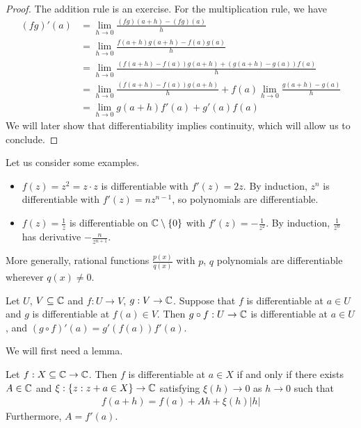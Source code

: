 \documentclass{../template/note}
\begin{document}
    \begin{proof}
        The addition rule is an exercise. For the multiplication rule, we have
        \begin{align*}
            (fg)'(a) &= \lim_{h \to 0} \frac{(fg)(a+h) - (fg)(a)}{h} \\
            &= \lim_{h \to 0} \frac{f(a+h)g(a+h)-f(a)g(a)}{h} \\
            &= \lim_{h \to 0} \frac{\left(f(a+h)-f(a)\right)g(a+h) + \left(g(a+h)-g(a)\right)f(a)}{h} \\
            &= \lim_{h \to 0} \frac{\left(f(a+h)-f(a)\right)g(a+h)}{h} + f(a)\lim_{h \to 0} \frac{g(a+h)-g(a)}{h} \\
            &= \lim_{h \to 0} g(a+h) f'(a) + g'(a)f(a)
        \end{align*}
        We will later show that differentiability implies continuity, which will allow us to conclude.
    \end{proof}    

    \begin{example*}
        Let us consider some examples.
        \begin{itemize}
            \item \(f(z) = z^2 = z \cdot z\) is differentiable with \(f'(z) = 2z\). By induction, \(z^n\) is differentiable with \(f'(z) = nz^{n-1}\), so polynomials are differentiable.
            \item \(f(z) = \frac 1 z\) is differentiable on \(\mathbb C \setminus \{0\}\) with \(f'(z) = -\frac 1 {z^2}\). By induction, \(\frac 1 {z^n}\) has derivative \(-\frac n {z^{n+1}}\).
        \end{itemize}
        More generally, rational functions \(\frac{p(x)}{q(x)}\) with \(p\), \(q\) polynomials are differentiable wherever \(q(x) \neq 0\).        
    \end{example*}

    
    \begin{proposition}
        Let \(U\), \(V \subseteq \mathbb C\) and \(f: U \to V\), \(g: V \to \mathbb C\). Suppose that \(f\) is differentiable at \(a \in U\) and \(g\) is differentiable at \(f(a) \in V\). Then \(g \circ f: U \to \mathbb C\) is differentiable at \(a \in U\), and \((g \circ f)'(a) = g'(f(a))f'(a)\).
    \end{proposition}
    
    We will first need a lemma.

    \begin{lemma}
        \label{little-o-derivative}
        Let \(f: X \subseteq \mathbb C \to \mathbb C\). Then \(f\) is differentiable at \(a \in X\) if and only if there exists \(A \in \mathbb C\) and \(\xi: \{z: z + a \in X\} \to \mathbb C\) satisfying \(\xi(h) \to 0\) as \(h \to 0\) such that
        \begin{align*}
            f(a+h) = f(a) + Ah + \xi(h)|h|
        \end{align*}
        Furthermore, \(A = f'(a)\).
    \end{lemma}
    
\end{document}
